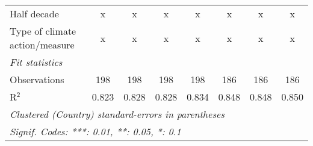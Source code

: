 \begin{tabular}{lccccccc}
   Half decade                                                                                   & x              & x             & x             & x             & x              & x              & x\\  
   Type of climate action/measure                                                                & x              & x             & x             & x             & x              & x              & x\\  
   \midrule \emph{Fit statistics}\\
   Observations                                                                                  & 198            & 198           & 198           & 198           & 186            & 186            & 186\\  
   R$^2$                                                                                         & 0.823          & 0.828         & 0.828         & 0.834         & 0.848          & 0.848          & 0.850\\  
   \midrule
   \multicolumn{8}{l}{\emph{Clustered (Country) standard-errors in parentheses}}\\
   \multicolumn{8}{l}{\emph{Signif. Codes: ***: 0.01, **: 0.05, *: 0.1}}\\
\end{tabular}
\par\endgroup



